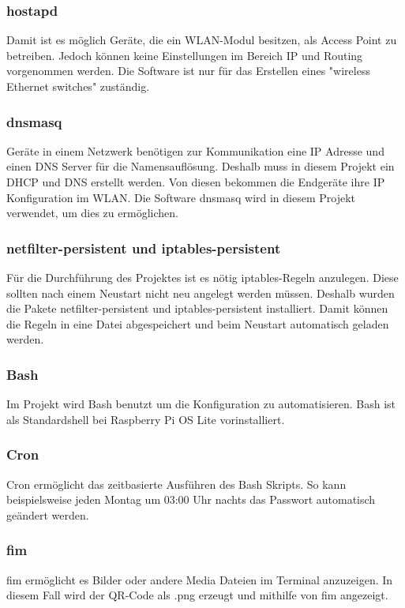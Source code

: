 \documentclass[a4paper,11pt,singlespacing]{article}
\begin{document}
    		\subsubsection{hostapd}
        		Damit ist es möglich Geräte, die ein WLAN-Modul besitzen, als Access Point zu betreiben. Jedoch können keine Einstellungen im Bereich IP und Routing vorgenommen werden. Die Software ist nur für das Erstellen eines "wireless Ethernet switches" zuständig. \cite{Quote_hostapd1} 
    		\subsubsection{dnsmasq}
        		Geräte in einem Netzwerk benötigen zur Kommunikation eine IP Adresse und einen DNS Server für die Namensauflösung. Deshalb muss in diesem Projekt ein DHCP und DNS erstellt werden. Von diesen bekommen die Endgeräte ihre IP Konfiguration im WLAN. Die Software dnsmasq wird in diesem Projekt verwendet, um dies zu ermöglichen.
    		\subsubsection{netfilter-persistent und iptables-persistent}
        		Für die Durchführung des Projektes ist es nötig iptables-Regeln anzulegen. Diese sollten nach einem Neustart nicht neu angelegt werden müssen. Deshalb wurden die Pakete netfilter-persistent und iptables-persistent installiert. Damit können die Regeln in eine Datei abgespeichert und beim Neustart automatisch geladen werden.
        	\subsubsection{Bash}
        		Im Projekt wird Bash benutzt um die Konfiguration zu automatisieren. Bash ist als Standardshell bei Raspberry Pi OS Lite vorinstalliert. 
    		\subsubsection{Cron}
				Cron ermöglicht das zeitbasierte Ausführen des Bash Skripts. So kann beispielsweise jeden Montag um 03:00 Uhr nachts das Passwort automatisch geändert werden.
			\subsubsection{fim}
				fim ermöglicht es Bilder oder andere Media Dateien im Terminal anzuzeigen. In diesem Fall wird der QR-Code als .png erzeugt und mithilfe von fim angezeigt. \cite{Quote_man_fim}
\end{document}
